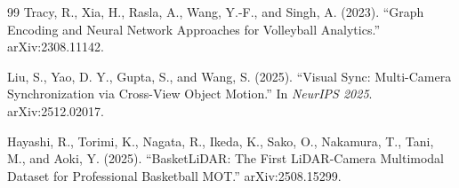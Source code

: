 \documentclass[a4paper]{article}
\begin{document}
\begin{thebibliography}{99}
 Tracy, R., Xia, H., Rasla, A., Wang, Y.-F., and Singh, A. (2023). ``Graph Encoding and Neural Network Approaches for Volleyball Analytics.'' arXiv:2308.11142.

 Liu, S., Yao, D. Y., Gupta, S., and Wang, S. (2025). ``Visual Sync: Multi-Camera Synchronization via Cross-View Object Motion.'' In \textit{NeurIPS 2025}. arXiv:2512.02017.

 Hayashi, R., Torimi, K., Nagata, R., Ikeda, K., Sako, O., Nakamura, T., Tani, M., and Aoki, Y. (2025). ``BasketLiDAR: The First LiDAR-Camera Multimodal Dataset for Professional Basketball MOT.'' arXiv:2508.15299.

\end{thebibliography}
\end{document}
